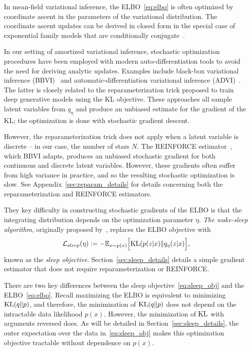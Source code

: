 In mean-field variational inference, the ELBO~\eqref{eq:elbo} is often optimized by coordinate ascent in the parameters of the variational distribution. 
The coordinate ascent updates can be derived in closed form in the special case of exponential family models that are conditionally conjugate~\cite{Blei_2017_vi_review}. 

In our setting of amortized variational inference, stochastic 
optimization procedures have been employed with modern 
auto-differentiation tools to avoid the need for deriving 
analytic updates. Examples include black-box variational inference (BBVI)~\cite{ranganath2013black} 
and automatic-differentiation variational inference (ADVI)~\cite{kucukelbir2016automatic}. The latter 
is closely related to the reparameterization trick \cite{kingma2013autoencoding, rezende2014stochastic} proposed to train deep generative models using the KL objective. 
These approaches all sample latent variables from $q_\eta$ and produce an unbiased estimate 
for the gradient of the KL; the optimization is done with stochastic gradient descent. 

However, the reparameterization trick does not apply when a latent variable is discrete -- in our case, the number of stars $N$. The REINFORCE estimator~\cite{Williams1992reinforce}, which BBVI adapts, produces an unbiased stochastic gradient for both continuous and discrete latent variables. However, these gradients often suffer from high variance in practice, and so the resulting stochastic optimization is slow. See Appendix~\ref{sec:reparam_details} for details concerning both the reparameterization and REINFORCE estimators. 

They key difficulty in constructing stochastic gradients of the ELBO is that the integrating distribution depends on the optimization parameter $\eta$. 
{\itshape The wake-sleep algorithm}, originally proposed by~\cite{Hinton1995wake_sleep}, replaces the 
ELBO objective with 
\begin{align}
    \mathcal{L}_{sleep}(\eta) := 
    - \mathbb{E}_{x \sim p(x)}\Big[\textrm{KL}(p(z | x) \| q_\eta(z | x)\Big]
    \label{eq:sleep_obj},
\end{align}
known as the {\itshape sleep objective}.  Section~\ref{sec:sleep_details} details a simple gradient estimator that does not require reparameterization or REINFORCE. 

There are two key differences between the sleep objective~\eqref{eq:sleep_obj} and the ELBO~\eqref{eq:elbo}. 
Recall maximizing the ELBO is equivalent to minimizing
$\textrm{KL}(q\|p)$, and 
therefore, the minimization of $\textrm{KL}(q\|p)$ does not depend on the intractable data likelihood $p(x)$. 
However, the minimization of $\textrm{KL}$ with arguments reversed does. 
As will be detailed in Section~\ref{sec:sleep_details}, the outer expectation over the data in~\eqref{eq:sleep_obj} makes this optimization objective tractable without dependence on $p(x)$. 

